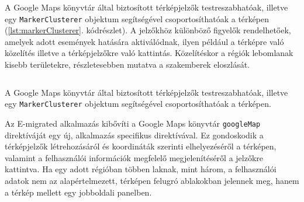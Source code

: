 A Google Maps könyvtár által biztosított térképjelzők testreszabhatóak, illetve egy \texttt{MarkerClusterer} objektum segítségével csoportosíthatóak a térképen (\ref{lst:markerClusterer}. kódrészlet). A jelzőkhöz különböző figyelők rendelhetőek, amelyek adott események hatására aktiválódnak, ilyen például a térképre való közelítés illetve a térképjelzőkre való kattintás. Közelítéskor a régiók lebomlanak kisebb területekre, részletesebben mutatva a szakemberek eloszlását. 
\begin{listing}
  \inputminted[fontsize=\small]{java}{progfiles/MarkerClusterer.js}
  \caption{A Google Maps könyvtár által biztosított térképjelzők testreszabhatóak, illetve egy \texttt{MarkerClusterer} objektum segítségével csoportosíthatóak a térképen.}
  \label{lst:markerClusterer}
\end{listing}

Az E-migrated alkalmazás kibővíti a Google Maps könyvtár \texttt{googleMap} direktíváját egy új, alkalmazás specifikus direktívával. Ez gondoskodik a térképjelzők létrehozásáról és koordináták szerinti elhelyezéséről a térképen, valamint a felhasználói információk megfelelő megjelenítéséről a jelzőkre kattintva. Ha egy adott régióban többen laknak, mint három, a felhasználói adatok nem az alapértelmezett, térképen felugró ablakokban jelennek meg, hanem a térkép mellett egy jobboldali panelben. 





 